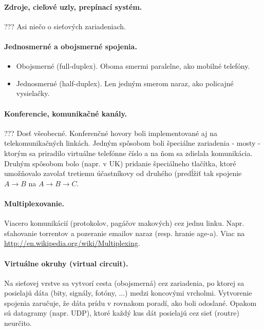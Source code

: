 \paragraph{Zdroje, cieľové uzly, prepínací systém.}
???
Asi niečo o sieťových zariadeniach. 
 
\paragraph{Jednosmerné a obojsmerné spojenia.}
       
\begin{itemize}                                  
\item Obojsmerné (full-duplex). Oboma smermi paralelne, ako mobilné telefóny.
\item Jednosmerné (half-duplex). Len jedným smerom naraz, ako policajné vysielačky.
\end{itemize} 
     
\paragraph{Konferencie, komunikačné kanály.}  
???
Dosť všeobecné. 
Konferenčné hovory boli implementované aj na telekomunikačných linkách. Jedným spôsobom boli špeciálne zariadenia - mosty - ktorým sa priradilo virtuálne telefónne číslo a na ňom sa zdielala komunikácia. Druhým spôsobom bolo (napr. v UK) pridanie špeciálneho tlačítka, ktoré umožňovalo zavolať tretiemu účastníkovy od druhého (predĺžiť tak spojenie $A \rightarrow B$ na $A \rightarrow B \rightarrow C$. 
  
\paragraph{Multiplexovanie.}   
\label{multiplexing}
Viacero komunikácií (protokolov, pagáčov makových) cez jednu linku. 
Napr. sťahovanie torrentov a pozeranie emailov naraz (resp. hranie age-a). 
Viac na \url{http://en.wikipedia.org/wiki/Multiplexing}.
       
\paragraph{Virtuálne okruhy (virtual circuit).}     
Na sieťovej vrstve sa vytvorí cesta (obojsmerná) cez zariadenia, po ktorej sa posielajú dáta (bity, signály, fotóny, ...) medzi koncovými vrcholmi. Vytvorenie spojenia zaručuje, že dáta prídu v rovnakom poradí, ako boli odoslané. Opakom sú datagramy (napr. UDP), ktoré každý kus dát posielajú cez sieť (routre) neurčito.   
    
